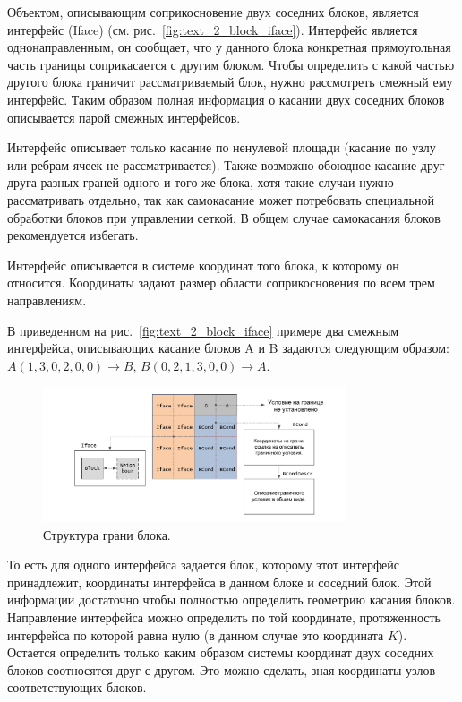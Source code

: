Объектом, описывающим соприкосновение двух соседних блоков, является интерфейс (Iface) (см. рис.~\ref{fig:text_2_block_iface}).
Интерфейс является однонаправленным, он сообщает, что у данного блока конкретная прямоугольная
часть границы соприкасается с другим блоком.
Чтобы определить с какой частью другого блока граничит рассматриваемый блок, нужно рассмотреть смежный ему интерфейс.
Таким образом полная информация о касании двух соседних блоков описывается парой смежных интерфейсов.

Интерфейс описывает только касание по ненулевой площади (касание по узлу или ребрам ячеек не рассматривается).
Также возможно обоюдное касание друг друга разных граней одного и того же блока, хотя такие случаи нужно рассматривать отдельно, так как самокасание может потребовать специальной обработки блоков при управлении сеткой.
В общем случае самокасания блоков рекомендуется избегать.

Интерфейс описывается в системе координат того блока, к которому он относится.
Координаты задают размер области соприкосновения по всем трем направлениям.

В приведенном на рис.~\ref{fig:text_2_block_iface} примере два смежным интерфейса, описывающих касание блоков A и B задаются следующим образом: $A(1, 3, 0, 2, 0, 0) \rightarrow B$, $B(0, 2, 1, 3, 0, 0) \rightarrow A$.

\begin{figure}[ht]
\centering
\includegraphics[width=0.8\textwidth]{./pics/text_2_block/8-facet.pdf}
\singlespacing
{}\caption{Структура грани блока.}
\label{fig:text_2_block_facet}
\end{figure}

То есть для одного интерфейса задается блок, которому этот интерфейс принадлежит, координаты интерфейса в данном блоке и соседний блок.
Этой информации достаточно чтобы полностью определить геометрию касания блоков.
Направление интерфейса можно определить по той координате, протяженность интерфейса по которой равна нулю (в данном случае это координата $K$).
Остается определить только каким образом системы координат двух соседних блоков соотносятся друг с другом.
Это можно сделать, зная координаты узлов соответствующих блоков.

